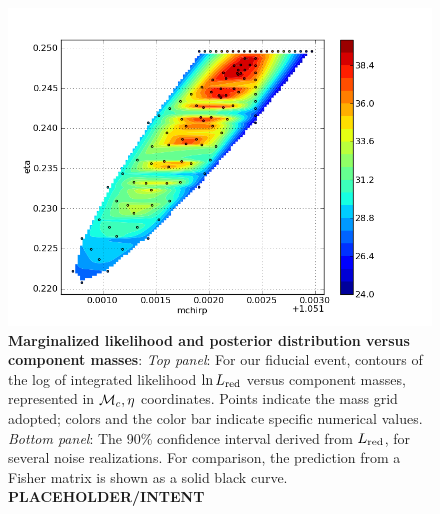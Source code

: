 \documentclass[twocolumn,prd,nofootinbib]{revtex4}
\newcommand\mc{{{\cal M}_c}}
\begin{document}
\begin{figure}
\includegraphics[width=\columnwidth]{../Figures/v2runs_coinc_id_833_mchirp_eta_logevidence}
\caption{\label{fig:FiducialEvent:LikelihoodVersusMchirpEta}\textbf{Marginalized likelihood and posterior distribution versus component masses}: \emph{Top panel}: For our fiducial event,
  contours of the log of integrated likelihood $\ln L_{\rm red}$ versus component masses, represented in $\mc,\eta$
  coordinates.  Points indicate the mass grid adopted; colors and the color bar indicate specific numerical values.   
\emph{Bottom panel}: The 90\% confidence interval derived from $L_{\rm red}$, for several noise realizations.  For
comparison, the prediction from a Fisher matrix is shown as a solid black curve.
 \textbf{PLACEHOLDER/INTENT}
}
\end{figure}
\end{document}

